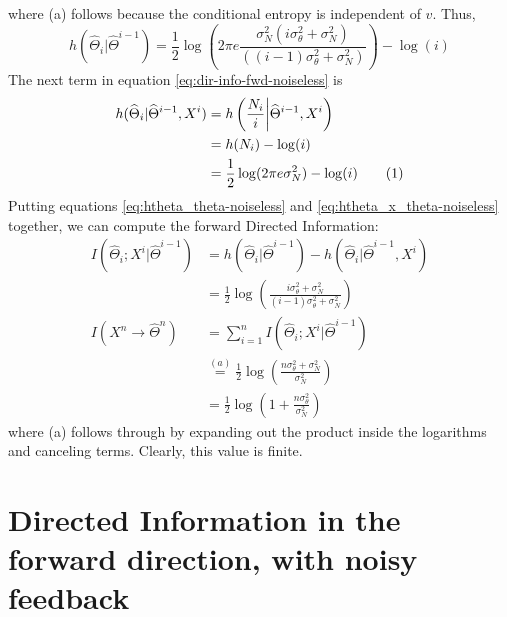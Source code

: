 \documentclass[letterpaper, 10pt, conference]{ieeeconf}
\newcommand\numberthis{\stepcounter{equation}\tag{\theequation}}
\begin{document}
where (a) follows because the conditional entropy is independent of $v$. Thus,
\begin{equation}
	h(\widehat{\Theta}_{i}|\widehat{\Theta}^{i-1}) = \frac{1}{2}\log\left(2\pi e\frac{\sigma_{N}^{2}(i\sigma_{\theta}^{2}+\sigma_{N}^{2})}{((i-1)\sigma_{\theta}^{2}+\sigma_{N}^{2})}\right)-\log(i) \label{eq:htheta_theta-noiseless}
\end{equation}
The next term in equation \eqref{eq:dir-info-fwd-noiseless} is
\begin{align*}
	h(\widehat{\Theta}_{i}|\widehat{\Theta}^{i-1},X^{i}) &= h\left(\frac{N_{i}}{i}\bigg|\widehat{\Theta}^{i-1},X^{i}\right) \\
												 &= h(N_{i}) -\log(i) \\
												 &= \frac{1}{2}\log(2\pi e\sigma_{N}^{2}) -\log(i) \numberthis \label{eq:htheta_x_theta-noiseless}
\end{align*}
Putting equations \eqref{eq:htheta_theta-noiseless} and \eqref{eq:htheta_x_theta-noiseless} together, we can compute the forward Directed Information:
\begin{align*}
	I(\widehat{\Theta}_{i};X^{i}|\widehat{\Theta}^{i-1}) &= h(\widehat{\Theta}_{i}|\widehat{\Theta}^{i-1}) - h(\widehat{\Theta}_{i}|\widehat{\Theta}^{i-1},X^{i}) \\
	                                             &= \frac{1}{2}\log\left(\frac{i\sigma_{\theta}^{2}+\sigma_{N}^{2}}{(i-1)\sigma_{\theta}^{2}+\sigma_{N}^{2}}\right) \\
	I(X^{n} \rightarrow \widehat{\Theta}^{n})    &= \sum_{i=1}^{n}I(\widehat{\Theta}_{i};X^{i}|\widehat{\Theta}^{i-1}) \\
												 &\overset{(a)}{=} \frac{1}{2}\log\left(\frac{n\sigma_{\theta}^{2}+\sigma_{N}^{2}}{\sigma_{N}^{2}}\right) \\
	                                             &= \frac{1}{2}\log\left(1+\frac{n\sigma_{\theta}^{2}}{\sigma_{N}^{2}}\right)
\end{align*}
where (a) follows through by expanding out the product inside the logarithms and canceling terms. Clearly, this value is finite.

\section{Directed Information in the forward direction, with noisy feedback}
\label{app:dir-info-fwd-noisy}
\end{document}
